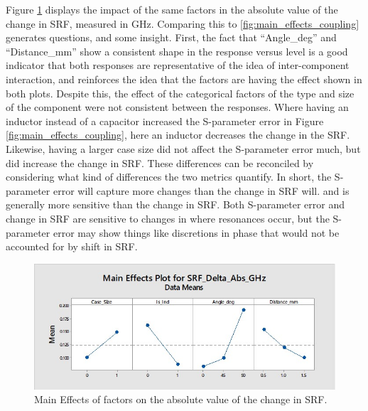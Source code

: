 \documentclass[12pt]{usfcoe}
\begin{document}
    Figure \ref{fig:main_effects_abs} displays the impact of the same factors in the absolute value of the change in SRF, measured in GHz. 
    Comparing this to \ref{fig:main_effects_coupling} generates questions, and some insight.
    First, the fact that ``Angle\_deg'' and ``Distance\_mm'' show a consistent shape in the response versus level is a good indicator that both responses are representative of the idea of inter-component interaction, and reinforces the idea that the factors are having the effect shown in both plots.
    Despite this, the effect of the categorical factors of the type and size of the component were not consistent between the responses. Where having an inductor instead of a capacitor increased the S-parameter error in Figure \ref{fig:main_effects_coupling}, here an inductor decreases the change in the SRF. 
    Likewise, having a larger case size did not affect the S-parameter error much, but did increase the change in SRF. 
    These differences can be reconciled by considering what kind of differences the two metrics quantify.
    In short, the S-parameter error will capture more changes than the change in SRF will. and is generally more sensitive than the change in SRF.
    Both S-parameter error and change in SRF are sensitive to changes in where resonances occur, but the S-parameter error may show things like discretions in phase that would not be accounted for by shift in SRF. 
    
    
    
    
    \begin{figure}[H]
		\begin{center}
        	\includegraphics[width=\textwidth]{images/ANOVA/AbsSRFDeltaGHz.jpg} 
			\caption{Main Effects of factors on the absolute value of the change in SRF.}
			\label{fig:main_effects_abs}
		\end{center}
    \end{figure}    
\end{document}
